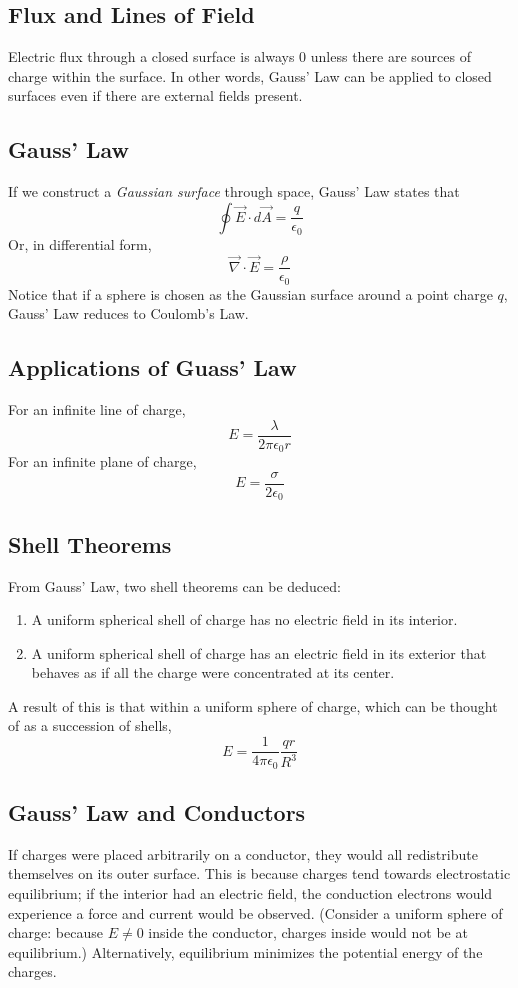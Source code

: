 \documentclass[../PhysicsFormulae.tex]{subfiles}
\begin{document}
\subsection{Flux and Lines of Field}
Electric flux through a closed surface is always 0 unless there are sources of charge within the surface. In other words, Gauss' Law can be applied to closed surfaces even if there are external fields present. 

\subsection{Gauss' Law}
If we construct a \textit{Gaussian surface} through space, Gauss' Law states that
\[ \oint \vec{E} \cdot d\vec{A} = \frac{q}{\epsilon_0} \]
Or, in differential form, 
\[ \vec{\nabla} \cdot \vec{E} = \frac{\rho}{\epsilon_0} \]
Notice that if a sphere is chosen as the Gaussian surface around a point charge $q$, Gauss' Law reduces to Coulomb's Law. 

\subsection{Applications of Guass' Law}
For an infinite line of charge, 
\[ E = \frac{\lambda}{2\pi \epsilon_0 r} \]
For an infinite plane of charge, 
\[ E = \frac{\sigma}{2\epsilon_0} \]

\subsection{Shell Theorems}
From Gauss' Law, two shell theorems can be deduced: 
\begin{enumerate}
	\itemsep0em
	\item A uniform spherical shell of charge has no electric field in its interior. 
	\item A uniform spherical shell of charge has an electric field in its exterior that behaves as if all the charge were concentrated at its center. 
\end{enumerate}
A result of this is that within a uniform sphere of charge, which can be thought of as a succession of shells, 
\[ E = \frac{1}{4\pi \epsilon_0} \frac{qr}{R^3} \]

\subsection{Gauss' Law and Conductors}
If charges were placed arbitrarily on a conductor, they would all redistribute themselves on its outer surface. This is because charges tend towards electrostatic equilibrium; if the interior had an electric field, the conduction electrons would experience a force and current would be observed. (Consider a uniform sphere of charge: because $E \neq 0$ inside the conductor, charges inside would not be at equilibrium.) Alternatively, equilibrium minimizes the potential energy of the charges. 
\end{document}

